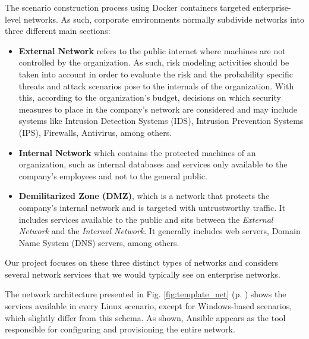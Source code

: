 The scenario construction process using Docker containers targeted enterprise-level networks. As such, corporate environments normally subdivide networks into three different main sections:

\begin{itemize}
    \item \textbf{External Network} refers to the public internet where machines are not controlled by the organization. As such, risk modeling activities should be taken into account in order to evaluate the risk and the probability specific threats and attack scenarios pose to the internals of the organization. With this, according to the organization's budget, decisions on which security measures to place in the company's network are considered and may include systems like Intrusion Detection Systems (IDS), Intrusion Prevention Systems (IPS), Firewalls, Antivirus, among others.
    \item \textbf{Internal Network} which contains the protected machines of an organization, such as internal databases and services only available to the company's employees and not to the general public.
    \item \textbf{Demilitarized Zone (DMZ)}, which is a network that protects the company's internal network and is targeted with untrustworthy traffic. It includes services available to the public and sits between the \textit{External Network} and the \textit{Internal Network}. It generally includes web servers, Domain Name System (DNS) servers, among others.
\end{itemize}

Our project focuses on these three distinct types of networks and considers several network services that we would typically see on enterprise networks.

The network architecture presented in Fig. \ref{fig:template_net} (p. \pageref{fig:template_net}) shows the services available in every Linux scenario, except for Windows-based scenarios, which slightly differ from this schema. As shown, Ansible appears as the tool responsible for configuring and provisioning the entire network.

